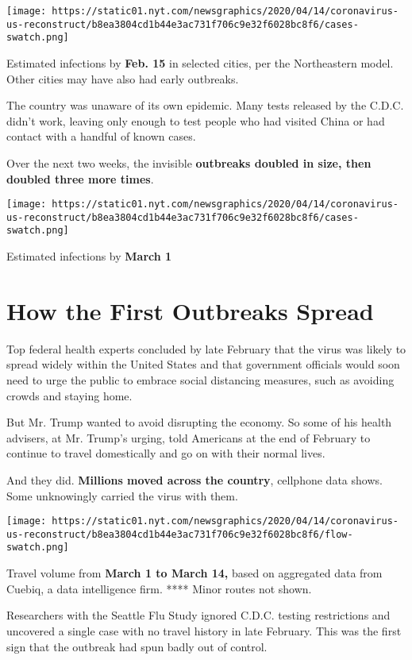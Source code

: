 \texttt{[image: https://static01.nyt.com/newsgraphics/2020/04/14/coronavirus-us-reconstruct/b8ea3804cd1b44e3ac731f706c9e32f6028bc8f6/cases-swatch.png]}

Estimated infections by \textbf{Feb. 15} in selected cities, per the
Northeastern model. Other cities may have also had early outbreaks.

The country was unaware of its own epidemic. Many tests released by the
C.D.C. didn't work, leaving only enough to test people who had visited
China or had contact with a handful of known cases.

Over the next two weeks, the invisible \textbf{outbreaks doubled in
size, then doubled three more times}.

\texttt{[image: https://static01.nyt.com/newsgraphics/2020/04/14/coronavirus-us-reconstruct/b8ea3804cd1b44e3ac731f706c9e32f6028bc8f6/cases-swatch.png]}

Estimated infections by \textbf{March 1}

\hypertarget{how-the-first-outbreaks-spread}{%
\section{How the First Outbreaks
Spread}\label{how-the-first-outbreaks-spread}}

Top federal health experts concluded by late February that the virus was
likely to spread widely within the United States and that government
officials would soon need to urge the public to embrace social
distancing measures, such as avoiding crowds and staying home.

But Mr. Trump wanted to avoid disrupting the economy. So some of his
health advisers, at Mr. Trump's urging, told Americans at the end of
February to continue to travel domestically and go on with their normal
lives.

And they did. \textbf{Millions moved across the country}, cellphone data
shows. Some unknowingly carried the virus with them.

\texttt{[image: https://static01.nyt.com/newsgraphics/2020/04/14/coronavirus-us-reconstruct/b8ea3804cd1b44e3ac731f706c9e32f6028bc8f6/flow-swatch.png]}

Travel volume from \textbf{March 1 to March 14,} based on aggregated
data from Cuebiq, a data intelligence firm. **** Minor routes not shown.

Researchers with the Seattle Flu Study ignored C.D.C. testing
restrictions and uncovered a single case with no travel history in late
February. This was the first sign that the outbreak had spun badly out
of control.

